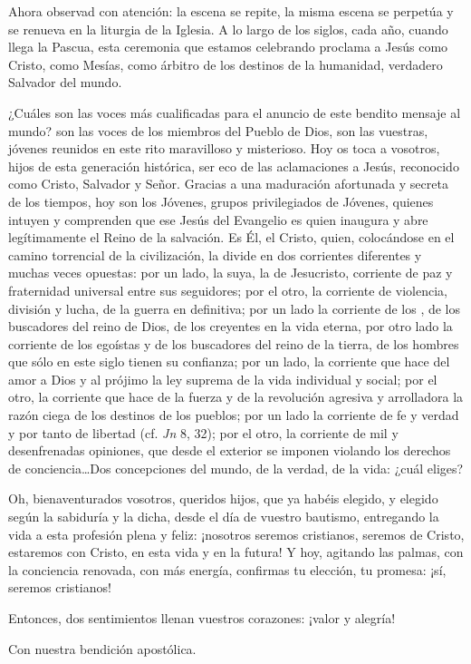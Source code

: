 \begin{body}
Ahora observad con atención: la escena se repite, la misma escena se perpetúa y se renueva en la liturgia de la Iglesia. A lo largo de los siglos, cada año, cuando llega la Pascua, esta ceremonia que estamos celebrando proclama a Jesús como Cristo, como Mesías, como árbitro de los destinos de la humanidad, verdadero Salvador del mundo. 

¿Cuáles son las voces más cualificadas para el anuncio de este bendito mensaje al mundo? son las voces de los miembros del Pueblo de Dios, son las vuestras, jóvenes reunidos en este rito maravilloso y misterioso. Hoy os toca a vosotros, hijos de esta generación histórica, ser eco de las aclamaciones a Jesús, reconocido como Cristo, Salvador y Señor. Gracias a una maduración afortunada y secreta de los tiempos, hoy son los Jóvenes, grupos privilegiados de Jóvenes, quienes intuyen y comprenden que ese Jesús del Evangelio es quien inaugura y abre legítimamente el Reino de la salvación. Es Él, el Cristo, quien, colocándose en el camino torrencial de la civilización, la divide en dos corrientes diferentes y muchas veces opuestas: por un lado, la suya, la de Jesucristo, corriente de paz y fraternidad universal entre sus seguidores; por el otro, la corriente de violencia, división y lucha, de la guerra en definitiva; por un lado la corriente de los , de los buscadores del reino de Dios, de los creyentes en la vida eterna, por otro lado la corriente de los egoístas y de los buscadores del reino de la tierra, de los hombres que sólo en este siglo tienen su confianza; por un lado, la corriente que hace del amor a Dios y al prójimo la ley suprema de la vida individual y social; por el otro, la corriente que hace de la fuerza y de la revolución agresiva y arrolladora la razón ciega de los destinos de los pueblos; por un lado la corriente de fe y verdad y por tanto de libertad (cf. \textit{Jn} 8, 32); por el otro, la corriente de mil y desenfrenadas opiniones, que desde el exterior se imponen violando los derechos de conciencia\ldots Dos concepciones del mundo, de la verdad, de la vida: ¿cuál eliges?

Oh, bienaventurados vosotros, queridos hijos, que ya habéis elegido, y elegido según la sabiduría y la dicha, desde el día de vuestro bautismo, entregando la vida a esta profesión plena y feliz: ¡nosotros seremos cristianos, seremos de Cristo, estaremos con Cristo, en esta vida y en la futura! Y hoy, agitando las palmas, con la conciencia renovada, con más energía, confirmas tu elección, tu promesa: ¡sí, seremos cristianos!

Entonces, dos sentimientos llenan vuestros corazones: ¡valor y alegría!

Con nuestra bendición apostólica.
\end{body}



